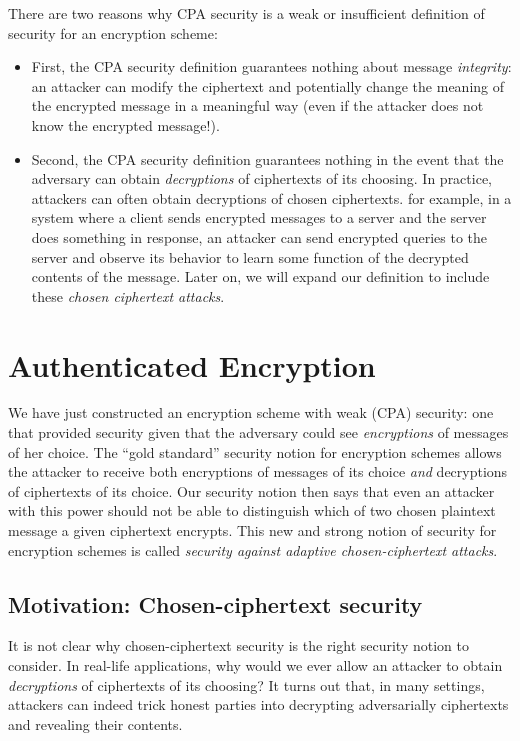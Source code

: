 \documentclass[
  letterpaper,
]{scrbook}
\providecommand{\tightlist}{%
  \setlength{\itemsep}{0pt}\setlength{\parskip}{0pt}}
\theoremstyle{definition}
\theoremstyle{plain}
\theoremstyle{plain}
\theoremstyle{remark}
\begin{document}
There are two reasons why CPA security is a weak or insufficient
definition of security for an encryption scheme:

\begin{itemize}
\tightlist
\item
  First, the CPA security definition guarantees nothing about message
  \emph{integrity}: an attacker can modify the ciphertext and
  potentially change the meaning of the encrypted message in a
  meaningful way (even if the attacker does not know the encrypted
  message!).
\item
  Second, the CPA security definition guarantees nothing in the event
  that the adversary can obtain \emph{decryptions} of ciphertexts of its
  choosing. In practice, attackers can often obtain decryptions of
  chosen ciphertexts. for example, in a system where a client sends
  encrypted messages to a server and the server does something in
  response, an attacker can send encrypted queries to the server and
  observe its behavior to learn some function of the decrypted contents
  of the message. Later on, we will expand our definition to include
  these \emph{chosen ciphertext attacks}.
\end{itemize}

\chapter{Authenticated Encryption}\label{authenticated-encryption}

We have just constructed an encryption scheme with weak (CPA) security:
one that provided security given that the adversary could see
\emph{encryptions} of messages of her choice. The ``gold standard''
security notion for encryption schemes allows the attacker to receive
both encryptions of messages of its choice \emph{and} decryptions of
ciphertexts of its choice. Our security notion then says that even an
attacker with this power should not be able to distinguish which of two
chosen plaintext message a given ciphertext encrypts. This new and
strong notion of security for encryption schemes is called
\emph{security against adaptive chosen-ciphertext attacks}.

\section{Motivation: Chosen-ciphertext
security}\label{motivation-chosen-ciphertext-security}

It is not clear why chosen-ciphertext security is the right security
notion to consider. In real-life applications, why would we ever allow
an attacker to obtain \emph{decryptions} of ciphertexts of its choosing?
It turns out that, in many settings, attackers can indeed trick honest
parties into decrypting adversarially ciphertexts and revealing their
contents.
\end{document}
